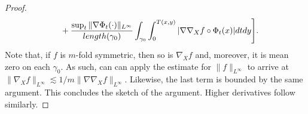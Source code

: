 \documentclass[10pt,a4paper]{amsart}
\newcommand{\rmd}{{\rm d}}
\begin{document}
\begin{proof}
\begin{align*}
&\qquad + \frac{\sup_t\| \nabla \Phi_t(\cdot ) \|_{L^\infty}}{{\rm length}(\gamma_0)}\int_{\gamma_0}\int_0^{T(x,y)} |\nabla \nabla_X  f\circ \Phi_t(x)| \rmd t \rmd y\Bigg].
\end{align*}
Note that, if $f$ is  $m$-fold symmetric, then so is $\nabla_X f$ and, moreover, it is mean zero on each $\gamma_0$.  As such, can can apply the estimate for $\|f\|_{L^\infty}$ to arrive at $\|\nabla_X f\|_{L^\infty}\lesssim 1/m \|\nabla \nabla_X f\|_{L^\infty}.$ Likewise, the last term is bounded by the same argument.  This concludes the sketch of the argument.  Higher derivatives follow similarly.
\end{proof}
\end{document}
